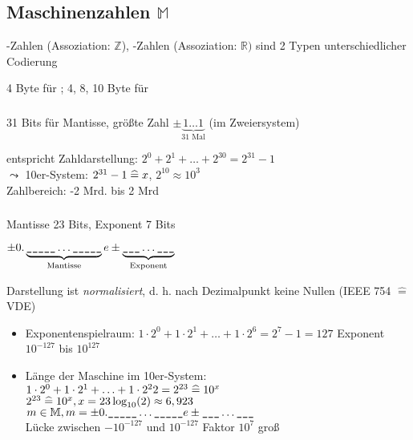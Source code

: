 \subsection{Maschinenzahlen $\mathbb{M}$}
\integer-Zahlen (Assoziation: $\mathbb{Z}$), \real-Zahlen (Assoziation: $\mathbb{R})$ sind 2 Typen unterschiedlicher Codierung

4 Byte für \integer; 4, 8, 10 Byte für \real

\subsubsection*{\integer}

31 Bits für Mantisse, größte Zahl $\pm \underbrace{1\ldots1}_{31\text{ Mal}}$ (im Zweiersystem)

entspricht Zahldarstellung: $2^0+2^1+\ldots+2^{30}=2^{31}-1$ \\
$\leadsto$ 10er-System: $2^{31}-1 \mathrel{\widehat{=}} x$, $2^{10}\approx 10^3$\\
Zahlbereich: -2 Mrd. bis 2 Mrd

\subsubsection*{}

Mantisse 23 Bits, Exponent 7 Bits

$\pm 0.\underbrace{\text{\ttfamily\_\_\_\_\_}\ldots\text{\ttfamily\_\_\_\_\_}}_{\text{Mantisse}}e\pm\underbrace{\text{\ttfamily\_\_\_}\ldots\text{\ttfamily\_\_\_}}_{\text{Exponent}}$

Darstellung ist \emph{normalisiert}, d. h. nach Dezimalpunkt keine Nullen (IEEE 754 $\hat{=}$ VDE)

\begin{itemize}
 \item Exponentenspielraum: $1\cdot 2^0+1\cdot2^1+\ldots+1\cdot2^6 = 2^7 -1 = 127$
  Exponent $10^{-127}$ bis $10^{127}$
 \item Länge der Maschine im 10er-System:\\
$1\cdot 2^0+1\cdot2^1+\ldots+1\cdot2^22=2^{23} \mathrel{\widehat{=}} 10^x$\\
$2^{23}\mathrel{\widehat{=}} 10^x, x=23 \log_{10}(2) \approx 6,923 $ \\
$m \in \mathbb{M}, m=\pm 0.\text{\ttfamily\_\_\_\_\_}\ldots\text{\ttfamily\_\_\_\_\_} e\pm \text{\ttfamily\_\_\_}\ldots\text{\ttfamily\_\_\_}$\\Lücke zwischen $-10^{-127}$ und $10^{-127}$ Faktor $10^7$ groß
\end{itemize}

